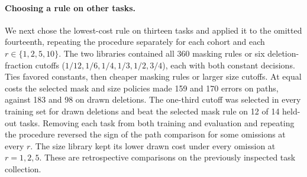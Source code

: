 \paragraph{Choosing a rule on other tasks.}
We next chose the lowest-cost rule on thirteen tasks and applied it to the omitted fourteenth, repeating the procedure separately for each cohort and each $r\in\{1,2,5,10\}$. The two libraries contained all 360 masking rules or six deletion-fraction cutoffs ($1/12,1/6,1/4,1/3,1/2,3/4$), each with both constant decisions. Ties favored constants, then cheaper masking rules or larger size cutoffs. At equal costs the selected mask and size policies made 159 and 170 errors on paths, against 183 and 98 on drawn deletions. The one-third cutoff was selected in every training set for drawn deletions and beat the selected mask rule on 12 of 14 held-out tasks. Removing each task from both training and evaluation and repeating the procedure reversed the sign of the path comparison for some omissions at every $r$. The size library kept its lower drawn cost under every omission at $r=1,2,5$. These are retrospective comparisons on the previously inspected task collection.
